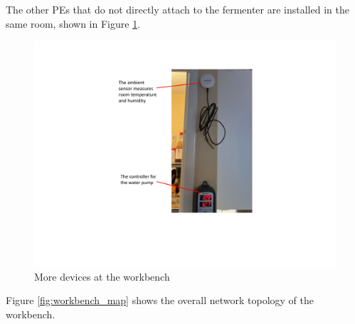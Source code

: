 \newpage
The other PEs that do not directly attach to the fermenter are installed in the same room, shown in Figure \ref{fig:workbench_other}. 

\begin{figure}[hbt!]
  \centering
  \includegraphics[scale=0.65]{figures/workbench_other.pdf}
  \caption{More devices at the workbench}
  \label{fig:workbench_other}
\end{figure}

Figure \ref{fig:workbench_map} shows the overall network topology of the workbench.


